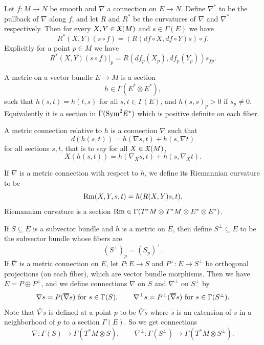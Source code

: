 \blemm

    Let $f\colon M\to N$ be smooth and $\nabla$ a connection on $E\to N$.
    Define $\nabla^*$ to be the pullback of $\nabla$ along $f$, and let $R$ and $R^*$ be the curvatures of $\nabla$ and $\nabla^*$
    respectively.
    Then for every $X,Y\in\X(M)$ and $s\in\Gamma(E)$ we have
    $$ R^*(X,Y)(s\circ f) = (R(df\circ X,df\circ Y)s)\circ f . $$
    Explicitly for a point $p\in M$ we have
    $$ R^*(X,Y)(s\circ f)|_p = R(df_p(X_p),df_p(Y_p))s_{fp} . $$

\elemm

\bdefn

    A {\emphcolor metric} on a vector bundle $E\to M$ is a section
    $$ h \in \Gamma(E^*\otimes E^*) , $$
    such that $h(s,t)=h(t,s)$ for all $s,t\in\Gamma(E)$, and $h(s,s)_p>0$ if $s_p\neq0$.
    Equivalently it is a section in $\Gamma(\sym^2E^*)$ which is positive definite on each fiber.

    A {\emphcolor metric connection} relative to $h$ is a connection $\nabla$ such that
    $$ d(h(s,t)) = h(\nabla s,t) + h(s,\nabla t) $$
    for all sections $s,t$, that is to say for all $X\in\X(M)$,
    $$ X(h(s,t)) = h(\nabla_Xs,t) + h(s,\nabla_Xt) . $$

    If $\nabla$ is a metric connection with respect to $h$, we define its {\emphcolor Riemannian curvature} to be
    $$ \Rm(X,Y,s,t) = h(R(X,Y)s,t) . $$
    Riemannian curvature is a section $\Rm\in\Gamma(T^*M\otimes T^*M\otimes E^*\otimes E^*)$.

\edefn

If $S\subseteq E$ is a subvector bundle and $h$ is a metric on $E$, then define $S^\perp\subseteq E$ to be the subvector bundle whose fibers are
$$ (S^\perp)_p = (S_p)^\perp . $$
If $\bar\nabla$ is a metric connection on $E$, let $P\colon E\to S$ and $P^\perp\colon E\to S^\perp$ be orthogonal projections (on each fiber),
which are vector bundle morphisms.
Then we have $E=P\oplus P^\perp$, and we define connections $\nabla$ on $S$ and $\nabla^\perp$ on $S^\perp$ by
$$ \nabla s = P(\bar\nabla s) \hbox{ for $s\in\Gamma(S)$},\qquad \nabla^\perp s = P^\perp(\bar\nabla s)\hbox{ for $s\in\Gamma(S^\perp)$} . $$
Note that $\bar\nabla s$ is defined at a point $p$ to be $\bar\nabla\tilde s$ where $\tilde s$ is an extension of $s$ in a neighborhood of
$p$ to a section $\Gamma(E)$.
So we get connections
$$ \nabla\colon\Gamma(S)\to\Gamma(T^*M\otimes S),\qquad \nabla^\perp\colon\Gamma(S^\perp)\to\Gamma(T^*M\otimes S^\perp) . $$

\bdefn

